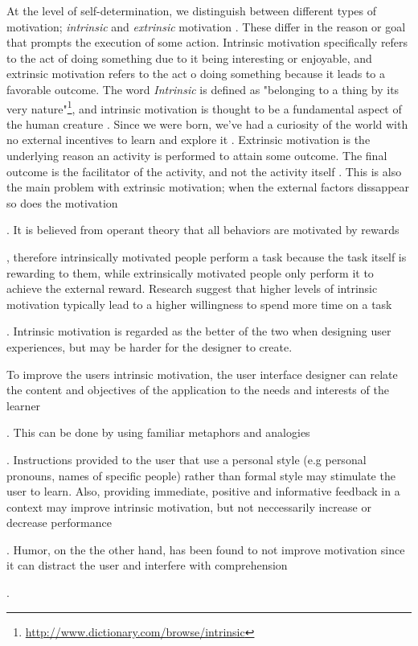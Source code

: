 At the level of self-determination, we distinguish between different types of motivation; \textit{intrinsic} and \textit{extrinsic} motivation \cite{Ryan2000a}. These differ in the reason or goal that prompts the execution of some action. Intrinsic motivation specifically refers to the act of doing something due to it being interesting or enjoyable, and extrinsic motivation refers to the act o doing something because it leads to a favorable outcome. The word \textit{Intrinsic} is defined as "belonging to a thing by its very nature"\footnote{\url{http://www.dictionary.com/browse/intrinsic}}, and intrinsic motivation is thought to be a fundamental aspect of the human creature \cite{White1959}. Since we were born, we've had a curiosity of the world with no external incentives to learn and explore it \cite{Ryan2000a}. Extrinsic motivation is the underlying reason an activity is performed to attain some outcome. The final outcome is the facilitator of the activity, and not the activity itself \cite{Ryan2000a}. This is also the main problem with extrinsic motivation; when the external factors dissappear so does the motivation . It is believed from operant theory that all behaviors are motivated by rewards , therefore intrinsically motivated people perform a task because the task itself is rewarding to them, while extrinsically motivated people only perform it to achieve the external reward. Research suggest that higher levels of intrinsic motivation typically lead to a higher willingness to spend more time on a task . Intrinsic motivation is regarded as the better of the two when designing user experiences, but may be harder for the designer to create.

To improve the users intrinsic motivation, the user interface designer can relate the content and objectives of the application to the needs and interests of the learner . This can be done by using familiar metaphors and analogies . Instructions provided to the user that use a personal style (e.g personal pronouns, names of specific people) rather than formal style may stimulate the user to learn. Also, providing immediate, positive and informative feedback in a context may improve intrinsic motivation, but not neccessarily increase or decrease performance . Humor, on the the other hand, has been found to not improve motivation since it can distract the user and interfere with comprehension .

